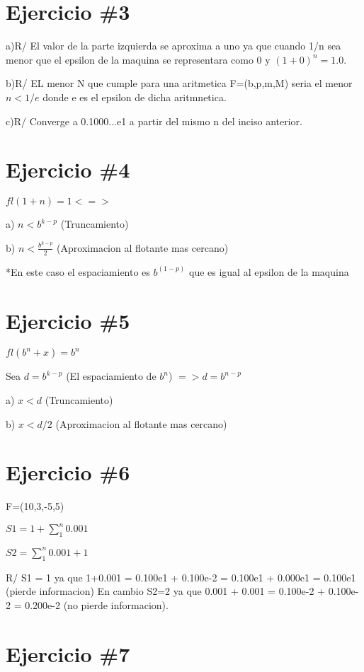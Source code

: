 \documentclass[a4paper,12pt]{article}
\begin{document}
\section*{Ejercicio \#3}

a)R/ El valor de la parte izquierda se aproxima a uno ya que cuando 1/n sea menor que el epsilon de la
maquina se representara como 0 y $(1+0)^n = 1.0$.

b)R/ EL menor N que cumple para una aritmetica F=(b,p,m,M) seria el menor $n<1/e$ donde e es el epsilon de dicha aritmnetica.

c)R/ Converge a 0.1000...e1 a partir del mismo n del inciso anterior.
\section*{Ejercicio \#4}

$fl(1 + n)=1 <=>$ 

a) $n < b^{k-p}$ (Truncamiento)

b) $n < \frac{b^{k-p}}{2} $ (Aproximacion al flotante mas cercano)

*En este caso el espaciamiento es $b^(1-p)$ que es igual al epsilon de la maquina

\section*{Ejercicio \#5}

$fl(b^n + x)=b^n$

Sea $d=b^{k-p}$ (El espaciamiento de $b^n$) $=> d=b^{n-p}$

a) $x < d$ (Truncamiento)

b) $x < d/2$ (Aproximacion al flotante mas cercano)

\section*{Ejercicio \#6}

F=(10,3,-5,5)

$S1=1+\sum_{1}^{n}0.001 $

$S2=\sum_{1}^{n}0.001 +1$

R/ S1 = 1 ya que 1+0.001 = 0.100e1 + 0.100e-2 = 0.100e1 + 0.000e1 = 0.100e1 (pierde informacion)
En cambio S2=2 ya que 0.001 + 0.001 = 0.100e-2 + 0.100e-2 = 0.200e-2 (no pierde informacion).

\section*{Ejercicio \#7}
\end{document}
